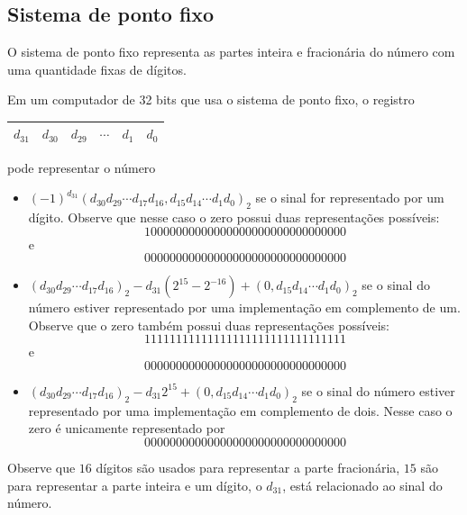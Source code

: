 \subsection{Sistema de ponto fixo}

O sistema de ponto fixo representa as partes inteira e fracionária do número com uma quantidade fixas de dígitos.

\begin{ex}
Em um computador de 32 bits que usa o sistema de ponto fixo, o registro
\begin{tabular}{|c|c|c|c|c|c|} \hline
  $d_{31}$ & $d_{30}$ & $d_{29}$ & $\cdots$ & $d_1$ & $d_0$\\\hline
\end{tabular}
pode representar o número
\begin{itemize}
\item $(-1)^{d_{31}}(d_{30}d_{29}\cdots d_{17}d_{16}, d_{15}d_{14}\cdots d_1d_0)_2$
se o sinal for representado por um dígito. Observe que nesse caso o zero possui duas representações possíveis: 
\begin{equation*}
  10000000000000000000000000000000  
\end{equation*}
e
\begin{equation*}
  00000000000000000000000000000000
\end{equation*}
\item $(d_{30}d_{29}\cdots d_{17}d_{16})_2-d_{31}(2^{15}-2^{-16})+(0,d_{15}d_{14}\cdots d_1d_0)_2$
se o sinal do número estiver representado por uma implementação em complemento de um. Observe que o zero também possui duas representações possíveis: 
\begin{equation*}
  11111111111111111111111111111111  
\end{equation*}
e
\begin{equation*}
  00000000000000000000000000000000
\end{equation*}
\item $(d_{30}d_{29}\cdots d_{17}d_{16})_2-d_{31}2^{15}+(0,d_{15}d_{14}\cdots d_1d_0)_2$
se o sinal do número estiver representado por uma implementação em complemento de dois. Nesse caso o zero é unicamente representado por
\begin{equation*}
  00000000000000000000000000000000  
\end{equation*}
\end{itemize}
Observe que $16$ dígitos são usados para representar a parte fracionária, $15$ são para representar a parte inteira e um dígito, o $d_{31}$, está relacionado ao sinal do número.
\end{ex}

